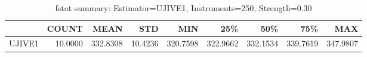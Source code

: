 \begin{table}[ht]
\centering
\caption{fstat summary: Estimator=UJIVE1, Instruments=250, Strength=0.30}
\begin{tabular}{lrrrrrrrr}
\toprule
 & COUNT & MEAN & STD & MIN & 25\% & 50\% & 75\% & MAX \\
\midrule
UJIVE1 & 10.0000 & 332.8308 & 10.4236 & 320.7598 & 322.9662 & 332.1534 & 339.7619 & 347.9807 \\
\bottomrule
\end{tabular}
\end{table}
